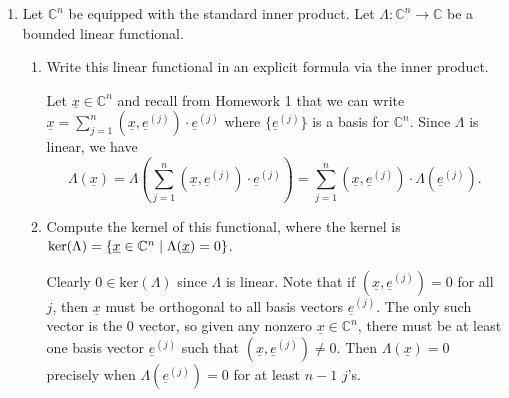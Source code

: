 \documentclass[11pt,oneside,english]{amsart}
\theoremstyle{definition}
\newcommand{\ve}{\varepsilon}
\newcommand{\MB}[1]{\mathbb{#1}}
\renewcommand{\vec}[1]{\underline{#1}}
\begin{document}
\begin{enumerate}
\begin{proof}
Now let $p=\infty$ and consider the family of characteristic functions $\{\chi_{B(0,\ve)}\}_{\ve>0}$. We have $\|\chi_{B(0,\ve)}\|_\infty=1$ for all $\ve>0$, and for any $\delta\neq\ve$, $\|\chi_{B(0,\ve)}-\chi_{B(0,\delta)}\|_\infty=1$ as well.

Suppose by way of contradiction that $L^\infty(\MB{T})$ is separable and there exists a countable dense subset $S$ of $L^\infty(\MB{T})$. Then $S$ must meet our family above, but it can only do so at a countable number of the singletons in our family, say $\{\chi_{B(0,\ve_i)}\}_{i=1}^\infty=S\cap\{\chi_{B(0,\ve)}\}_{\ve>0}$. Now we may write
\[
\{\chi_{B(0,\ve)}\}_{\ve>0}=\{\chi_{B(0,\ve_i)}\}_{i=1}^\infty\cup\left(\{\chi_{B(0,\ve_i)}\}_{i=1}^\infty\right)^c.
\]
But $\left(\{\chi_{B(0,\ve_i)}\}_{i=1}^\infty\right)^c$ is an uncountable open set since $\{\chi_{B(0,\ve_i)}\}_{i=1}^\infty$ is a countable closed set and $\{\chi_{B(0,\ve)}\}_{\ve>0}$ is uncountable. Consequently, there exists an open set that contains no element of our dense subset $S$, which contradicts the fact that $S$ is dense. Therefore, $L^\infty(\MB{T})$ cannot be separable.
\end{proof}


\item Let $\MB{C}^n$ be equipped with the standard inner product. Let $\Lambda:\MB{C}^n\to\MB{C}$ be a bounded linear functional.
\begin{enumerate}
\item Write this linear functional in an explicit formula via the inner product.

Let $\vec x\in\MB{C}^n$ and recall from Homework 1 that we can write $\vec x=\sum^n_{j=1}( \vec x,\vec e^{(j)}) \cdot \vec e^{(j)}$ where $\{\vec e^{(j)}\}$ is a basis for $\MB{C}^n$. Since $\Lambda$ is linear, we have
\[
\Lambda(\vec x)=\Lambda\left(\sum^n_{j=1}(\vec x,\vec e^{(j)}) \cdot \vec e^{(j)}\right)=\sum^n_{j=1}( \vec x,\vec e^{(j)}) \cdot \Lambda(\vec e^{(j)}).
\]

\item Compute the kernel of this functional, where the kernel is $\text{ker}(\Lambda)=\{\uline{x}\in\MB{C}^n\mid\Lambda(\uline{x})=0\}$.

Clearly $0\in \text{ker}(\Lambda)$ since $\Lambda$ is linear. Note that if $(\vec x,\vec e^{(j)})=0$ for all $j$, then $\vec x$ must be orthogonal to all basis vectors $\vec e^{(j)}$. The only such vector is the 0 vector, so given any nonzero $\vec x\in\MB{C}^n$, there must be at least one basis vector $\vec e^{(j)}$ such that $(\vec x,\vec e^{(j)})\neq0$. Then $\Lambda(\vec x)=0$ precisely when $\Lambda(\vec e^{(j)})=0$ for at least $n-1$ $j$'s.


\end{enumerate}
\end{enumerate}
\end{document}
